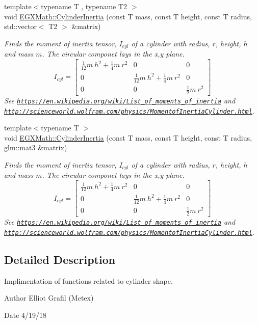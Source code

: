 \begin{DoxyCompactItemize}
{\footnotesize template$<$typename T , typename T2 $>$ }\\void \mbox{\hyperlink{group___e_g_x_math-_geometry-_cylinder_gac46dd57839cb2157d1bb6dd430d781ec}{E\+G\+X\+Math\+::\+Cylinder\+Inertia}} (const T mass, const T height, const T radius, std\+::vector$<$ T2 $>$ \&matrix)
\begin{DoxyCompactList}\small\item\em Finds the moment of inertia tensor, $I_{cyl}$ of a cylinder with radius, $r$, height, $h$ and mass $m$. The circular componet lays in the x,y plane. \[ I_{cyl}=\begin{bmatrix} \frac{1}{12}m\ h^2 + \frac{1}{4}m\ r^2 & 0 & 0\\ 0 & \frac{1}{12}m\ h^2 + \frac{1}{4}m\ r^2 & 0\\ 0 & 0 & \frac{1}{2}m\ r^2 \end{bmatrix} \] See \href{https://en.wikipedia.org/wiki/List_of_moments_of_inertia}{\tt https\+://en.\+wikipedia.\+org/wiki/\+List\+\_\+of\+\_\+moments\+\_\+of\+\_\+inertia} and \href{http://scienceworld.wolfram.com/physics/MomentofInertiaCylinder.html}{\tt http\+://scienceworld.\+wolfram.\+com/physics/\+Momentof\+Inertia\+Cylinder.\+html}. \end{DoxyCompactList}\item 
{\footnotesize template$<$typename T $>$ }\\void \mbox{\hyperlink{group___e_g_x_math-_geometry-_cylinder_ga5d9256549303e88a49b72e3d4c2c4a6d}{E\+G\+X\+Math\+::\+Cylinder\+Inertia}} (const T mass, const T height, const T radius, glm\+::mat3 \&matrix)
\begin{DoxyCompactList}\small\item\em Finds the moment of inertia tensor, $I_{cyl}$ of a cylinder with radius, $r$, height, $h$ and mass $m$. The circular componet lays in the x,y plane. \[ I_{cyl}=\begin{bmatrix} \frac{1}{12}m\ h^2 + \frac{1}{4}m\ r^2 & 0 & 0\\ 0 & \frac{1}{12}m\ h^2 + \frac{1}{4}m\ r^2 & 0\\ 0 & 0 & \frac{1}{2}m\ r^2 \end{bmatrix} \] See \href{https://en.wikipedia.org/wiki/List_of_moments_of_inertia}{\tt https\+://en.\+wikipedia.\+org/wiki/\+List\+\_\+of\+\_\+moments\+\_\+of\+\_\+inertia} and \href{http://scienceworld.wolfram.com/physics/MomentofInertiaCylinder.html}{\tt http\+://scienceworld.\+wolfram.\+com/physics/\+Momentof\+Inertia\+Cylinder.\+html}. \end{DoxyCompactList}\end{DoxyCompactItemize}


\subsection{Detailed Description}
Implimentation of functions related to cylinder shape. 

\begin{DoxyAuthor}{Author}
Elliot Grafil (Metex) 
\end{DoxyAuthor}
\begin{DoxyDate}{Date}
4/19/18 
\end{DoxyDate}
